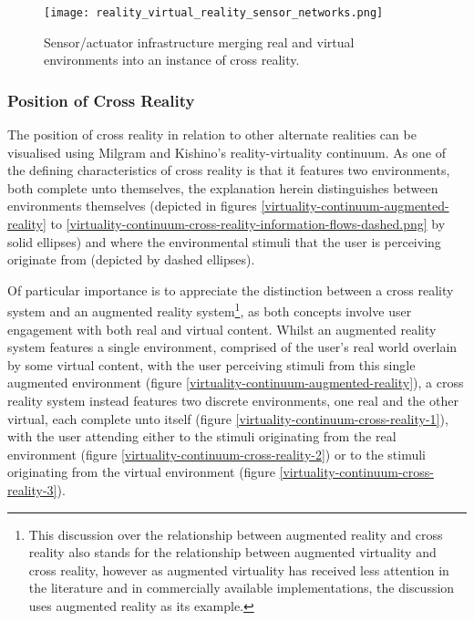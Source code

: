 \begin{figure}[h]
	\centering
	\texttt{[image: reality\_virtual\_reality\_sensor\_networks.png]}
	\caption{Sensor/actuator infrastructure merging real and virtual environments into an instance of cross reality.}
	\label{reality_virtual_reality_sensor_networks.png}
\end{figure}



\subsubsection{Position of Cross Reality}

\label{positionofcrossreality}

\newcommand{\avxrfootnote}{\footnote{This discussion over the relationship between augmented reality and cross reality also stands for the relationship between augmented virtuality and cross reality, however as augmented virtuality has received less attention in the literature and in commercially available implementations, the discussion uses augmented reality as its example.}}

The position of cross reality in relation to other alternate realities can be visualised using Milgram and Kishino's reality-virtuality continuum. As one of the defining characteristics of cross reality is that it features two environments, both complete unto themselves, the explanation herein distinguishes between environments themselves (depicted in figures \ref{virtuality-continuum-augmented-reality} to \ref{virtuality-continuum-cross-reality-information-flows-dashed.png} by solid ellipses) and where the environmental stimuli that the user is perceiving originate from (depicted by dashed ellipses).


Of particular importance is to appreciate the distinction between a cross reality system and an augmented reality system\avxrfootnote{}, as both concepts involve user engagement with both real and virtual content. Whilst an augmented reality system features a single environment, comprised of the user's real world overlain by some virtual content, with the user perceiving stimuli from this single augmented environment (figure \ref{virtuality-continuum-augmented-reality}), a cross reality system instead features two discrete environments, one real and the other virtual, each complete unto itself (figure \ref{virtuality-continuum-cross-reality-1}), with the user attending either to the stimuli originating from the real environment (figure \ref{virtuality-continuum-cross-reality-2}) or to the stimuli originating from the virtual environment (figure \ref{virtuality-continuum-cross-reality-3}).

